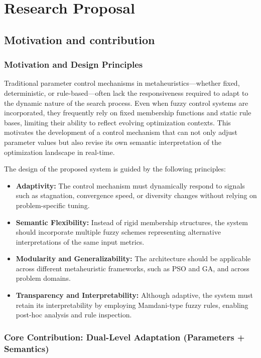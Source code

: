 \chapter{Research Proposal} \label{chapter:proposal}

\section{Motivation and contribution}
\subsection{Motivation and Design Principles}

Traditional parameter control mechanisms in metaheuristics—whether fixed, deterministic, or rule-based—often lack the responsiveness required to adapt to the dynamic nature of the search process. Even when fuzzy control systems are incorporated, they frequently rely on fixed membership functions and static rule bases, limiting their ability to reflect evolving optimization contexts. This motivates the development of a control mechanism that can not only adjust parameter values but also revise its own semantic interpretation of the optimization landscape in real-time.

The design of the proposed system is guided by the following principles:

\begin{itemize}
    \item \textbf{Adaptivity:} The control mechanism must dynamically respond to signals such as stagnation, convergence speed, or diversity changes without relying on problem-specific tuning.
    \item \textbf{Semantic Flexibility:} Instead of rigid membership structures, the system should incorporate multiple fuzzy schemes representing alternative interpretations of the same input metrics.
    \item \textbf{Modularity and Generalizability:} The architecture should be applicable across different metaheuristic frameworks, such as PSO and GA, and across problem domains.
    \item \textbf{Transparency and Interpretability:} Although adaptive, the system must retain its interpretability by employing Mamdani-type fuzzy rules, enabling post-hoc analysis and rule inspection.
\end{itemize}

\subsection{Core Contribution: Dual-Level Adaptation (Parameters + Semantics)}

